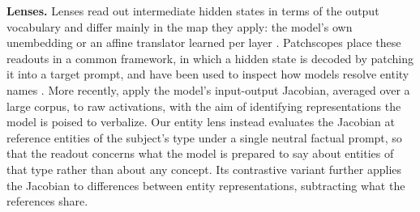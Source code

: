 \textbf{Lenses.} Lenses read out intermediate hidden states in terms of the output
vocabulary and differ mainly in the map they apply: the model's own
unembedding \citep{nostalgebraist2020interpreting} or an affine
translator learned per layer \citep{belrose2023eliciting}. Patchscopes
place these readouts in a common framework, in which a hidden state is
decoded by patching it into a target prompt, and have been used to
inspect how models resolve entity names
\citep{ghandeharioun2024patchscopes}. More recently,
\citet{gurnee2026workspace} apply the model's input-output Jacobian,
averaged over a large corpus, to raw activations, with the aim of
identifying representations the model is poised to verbalize. Our entity lens instead evaluates the Jacobian at reference entities of the subject's type under a single neutral factual prompt, so that the
readout concerns what the model is prepared to say about entities of
that type rather than about any concept. Its contrastive variant further
applies the Jacobian to differences between entity representations,
subtracting what the references share.


%
%
%
%
%

